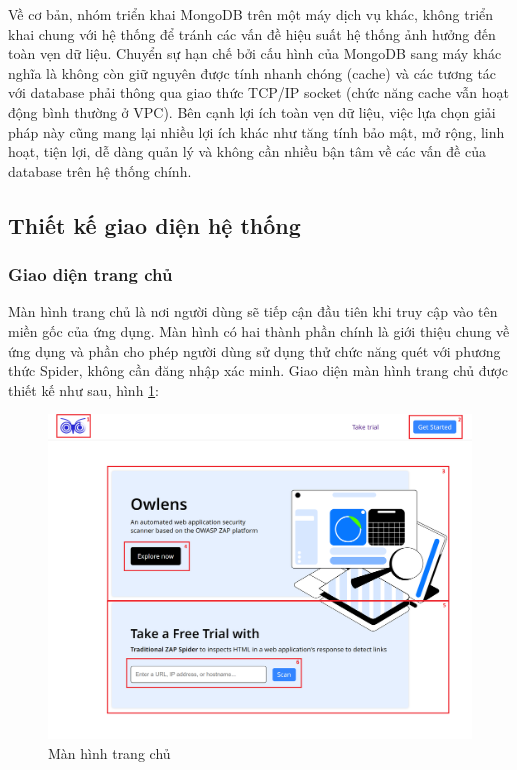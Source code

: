 Về cơ bản, nhóm triển khai MongoDB trên một máy dịch vụ khác, không triển khai chung với hệ thống để tránh các vấn đề hiệu suất hệ thống ảnh hưởng đến toàn vẹn dữ liệu.
Chuyển sự hạn chế bởi cấu hình của MongoDB sang máy khác nghĩa là không còn giữ nguyên được tính nhanh chóng (cache) và các tương tác với database phải thông qua giao thức TCP/IP socket (chức năng cache vẫn hoạt động bình thường ở VPC).
Bên cạnh lợi ích toàn vẹn dữ liệu, việc lựa chọn giải pháp này cũng mang lại nhiều lợi ích khác như tăng tính bảo mật, mở rộng, linh hoạt, tiện lợi, dễ dàng quản lý và không cần nhiều bận tâm về các vấn đề của database trên hệ thống chính.

\subsection{Thiết kế giao diện hệ thống}

\subsubsection{Giao diện trang chủ}

\tab Màn hình trang chủ là nơi người dùng sẽ tiếp cận đầu tiên khi truy cập vào tên miền gốc của ứng dụng.
Màn hình có hai thành phần chính là giới thiệu chung về ứng dụng và phần cho phép người dùng sử dụng thử chức năng quét với phương thức Spider, không cần đăng nhập xác minh.
Giao diện màn hình trang chủ được thiết kế như sau, hình \ref{fig:MHTrangChu}:

\begin{figure}[H]
      \centering
      \includegraphics[width=\textwidth]{applied-thesis-chapters/chapter-3/Màn hình trang chủ.png}
      \caption{Màn hình trang chủ}
      \label{fig:MHTrangChu}
\end{figure}

